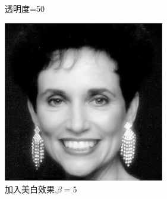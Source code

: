 \documentclass[11pt, a4paper, UTF8]{ctexart}
\begin{document}
\begin{figure}[H]
\begin{minipage}[t]{0.48\textwidth}
        \caption{透明度=50}
        \end{minipage}
      \begin{minipage}[t]{0.48\textwidth}
        \centering
        \includegraphics[width=7cm]{RF_log.jpg}
        \caption{加入美白效果,$\beta=5$}
        \end{minipage}
    \end{figure}
\end{document}
